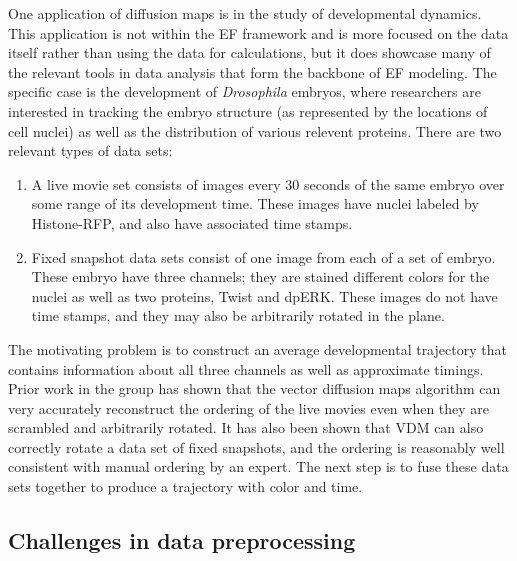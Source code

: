 \documentclass[12pt]{article}
\begin{document}
One application of diffusion maps is in the study of developmental dynamics. This application is not within the EF framework and is more focused on the data itself rather than using the data for calculations, but it does showcase many of the relevant tools in data analysis that form the backbone of EF modeling. The specific case is the development of 	\textit{Drosophila} embryos, where researchers are interested in tracking the embryo structure (as represented by the locations of cell nuclei) as well as the distribution of various relevent proteins. There are two relevant types of data sets:

\begin{enumerate}
\item A live movie set consists of images every 30 seconds of the same embryo over some range of its development time. These images have nuclei labeled by Histone-RFP, and also have associated time stamps.
\item Fixed snapshot data sets consist of one image from each of a set of embryo. These embryo have three channels; they are stained different colors for the nuclei as well as two proteins, Twist and dpERK. These images do not have time stamps, and they may also be arbitrarily rotated in the plane.
\end{enumerate}

The motivating problem is to construct an average developmental trajectory that contains information about all three channels as well as approximate timings. Prior work in the group has shown that the vector diffusion maps algorithm can very accurately reconstruct the ordering of the live movies even when they are scrambled and arbitrarily rotated. It has also been shown that VDM can also correctly rotate a data set of fixed snapshots, and the ordering is reasonably well consistent with manual ordering by an expert. The next step is to fuse these data sets together to produce a trajectory with color and time.

\subsection{Challenges in data preprocessing}
\end{document}
